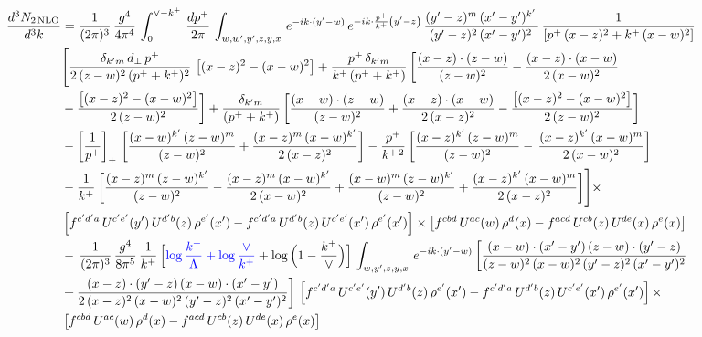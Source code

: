 \documentclass[9pt]{article}
\numberwithin{equation}{section}
\begin{document}
\begin{align}
 \frac{d^{3}N_{2\,\rm NLO}}{d^{3}k} & = \frac{1}{(2\pi)^{3}}\,\frac{g^{4}}{4\pi^{4}}\,\int_{0}^{\vee-k^{+}}\, \frac{dp^{+}}{2\pi}\,\int_{w,w',y',z,y,x}\, e^{-ik\cdot (y'-w)}\,e^{-ik\cdot \frac{p^{+}}{k^{+}}\left(y'-z\right)}\, \frac{(y'-z)^{m}\,(x'-y')^{k'}\,}{(y'-z)^{2}\,(x'-y')^{2}\,}\, \frac{1}{\left[p^{+}\,(x-z)^{2}+k^{+}\,(x-w)^{2}\right]}\notag \\ & \Bigg[\frac{\delta_{k'm}\,d_{\perp}\,p^{+}}{2\,(z-w)^{2}\,(p^{+}+k^{+})^{2}}\, \left[(x-z)^{2}-(x-w)^{2}\right]+\frac{p^{+}\,\delta_{k'm}}{k^{+}\,(p^{+}+k^{+})}\,\bigg[\frac{(x-z)\cdot (z-w)}{(z-w)^{2}} -\frac{(x-z)\cdot (x-w)}{2\,(x-w)^{2}}\notag \\ & -\frac{\left[(x-z)^{2}-(x-w)^{2}\right]}{2\,(z-w)^{2}}\bigg] +\frac{\delta_{k'm}}{(p^{+}+k^{+})}\,\bigg[\frac{(x-w)\cdot (z-w)}{(z-w)^{2}}+\frac{(x-z)\cdot (x-w)}{2\,(x-z)^{2}} -\frac{\left[(x-z)^{2}-(x-w)^{2}\right]}{2\,(z-w)^{2}}\bigg]\notag \\ & -\left[\frac{1}{p^{+}}\right]_{+}\,\bigg[\frac{(x-w)^{k'}\,(z-w)^{m}}{(z-w)^{2}}+\frac{(x-z)^{m}\,(x-w)^{k'}}{2\,(x-z)^{2}}\bigg]-\frac{p^{+}}{k^{+\,2}}\,\bigg[\frac{(x-z)^{k'}\,(z-w)^{m}}{(z-w)^{2}} -\,\frac{(x-z)^{k'}\,(x-w)^{m}}{2\,(x-w)^{2}}\bigg]\notag \\ & -\frac{1}{k^{+}}\,\bigg[\frac{(x-z)^{m}\,(z-w)^{k'}}{(z-w)^{2}}-\frac{(x-z)^{m}\,(x-w)^{k'}}{2\,(x-w)^{2}}+\frac{(x-w)^{m}\,(z-w)^{k'}}{(z-w)^{2}} +\frac{(x-z)^{k'}\,(x-w)^{m}}{2\,(x-z)^{2}}\bigg]\Bigg]\times\,\notag \\ & \left[f^{c'd'a}\,U^{c'e'}(y')\,U^{d'b}(z)\,\rho^{e'}(x')-f^{c'd'a}\, 
    U^{d'b}(z)\,U^{c'e'}(x')\,\rho^{e'}(x')\right]\times \left[f^{cbd}\,U^{ac}(w)\,\rho^{d}(x) -f^{acd}\,U^{cb}(z)\,U^{de}(x)\,\rho^{e}(x)\right]\notag \\ &  -\, \frac{1}{(2\pi)^{3}}\,\frac{g^{4}}{8\pi^{5}}\,\frac{1}{k^{+}}\,\Big[{\color{blue}\log\frac{k^{+}}{\Lambda}+\log\frac{\vee}{k^{+}}}+\log\Big(1-\frac{k^{+}}{\vee}\Big)\Big]\,\int_{w,y',z,y,x}\, e^{-ik\cdot (y'-w)}\,\bigg[\frac{(x-w)\cdot (x'-y')\,(z-w)\cdot (y'-z)}{(z-w)^{2}\,(x-w)^{2}\,(y'-z)^{2}\,(x'-y')^{2}}\notag \\ & +\frac{(x-z)\cdot (y'-z)\,(x-w)\cdot (x'-y')}{2\,(x-z)^{2}\,(x-w)^{2}\,(y'-z)^{2}\,(x'-y')^{2}}\bigg]\, \left[f^{c'd'a}\,U^{c'e'}(y')\,U^{d'b}(z)\,\rho^{e'}(x')-f^{c'd'a}\, 
    U^{d'b}(z)\,U^{c'e'}(x')\,\rho^{e'}(x')\right]\times\notag \\ &  \left[f^{cbd}\,U^{ac}(w)\,\rho^{d}(x) -f^{acd}\,U^{cb}(z)\,U^{de}(x)\,\rho^{e}(x)\right] 
\end{align}
\end{document}
